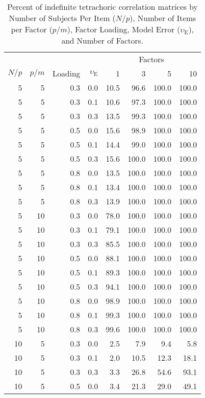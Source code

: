 \documentclass[
  english,
  man]{apa6}
\begin{document}
\begin{appendix}
\begin{longtable}[t]{rrrrrrrr}
\caption{\label{tab:percent-indefinite}Percent of indefinite tetrachoric correlation
matrices by Number of Subjects Per Item (\(N/p\)), Number of Items per
Factor (\(p/m\)), Factor Loading, Model Error (\(\upsilon_\textrm{E}\)),
and Number of Factors.}\\
\toprule
\multicolumn{4}{c}{ } & \multicolumn{4}{c}{Factors} \\
\cmidrule(l{3pt}r{3pt}){5-8}
$N/p$ & $p/m$ & Loading & $\upsilon_{\textrm{E}}$ & 1 & 3 & 5 & 10\\
\midrule
5 & 5 & 0.3 & 0.0 & 10.5 & 96.6 & 100.0 & 100.0\\
5 & 5 & 0.3 & 0.1 & 10.6 & 97.3 & 100.0 & 100.0\\
5 & 5 & 0.3 & 0.3 & 13.5 & 99.3 & 100.0 & 100.0\\
5 & 5 & 0.5 & 0.0 & 15.6 & 98.9 & 100.0 & 100.0\\
5 & 5 & 0.5 & 0.1 & 14.4 & 99.0 & 100.0 & 100.0\\
5 & 5 & 0.5 & 0.3 & 15.6 & 100.0 & 100.0 & 100.0\\
5 & 5 & 0.8 & 0.0 & 13.5 & 100.0 & 100.0 & 100.0\\
5 & 5 & 0.8 & 0.1 & 13.4 & 100.0 & 100.0 & 100.0\\
5 & 5 & 0.8 & 0.3 & 13.9 & 100.0 & 100.0 & 100.0\\
5 & 10 & 0.3 & 0.0 & 78.0 & 100.0 & 100.0 & 100.0\\
5 & 10 & 0.3 & 0.1 & 79.1 & 100.0 & 100.0 & 100.0\\
5 & 10 & 0.3 & 0.3 & 85.5 & 100.0 & 100.0 & 100.0\\
5 & 10 & 0.5 & 0.0 & 88.1 & 100.0 & 100.0 & 100.0\\
5 & 10 & 0.5 & 0.1 & 89.3 & 100.0 & 100.0 & 100.0\\
5 & 10 & 0.5 & 0.3 & 94.1 & 100.0 & 100.0 & 100.0\\
5 & 10 & 0.8 & 0.0 & 98.9 & 100.0 & 100.0 & 100.0\\
5 & 10 & 0.8 & 0.1 & 99.3 & 100.0 & 100.0 & 100.0\\
5 & 10 & 0.8 & 0.3 & 99.6 & 100.0 & 100.0 & 100.0\\
10 & 5 & 0.3 & 0.0 & 2.5 & 7.9 & 9.4 & 5.8\\
10 & 5 & 0.3 & 0.1 & 2.0 & 10.5 & 12.3 & 18.1\\
10 & 5 & 0.3 & 0.3 & 3.3 & 26.8 & 54.6 & 93.1\\
10 & 5 & 0.5 & 0.0 & 3.4 & 21.3 & 29.0 & 49.1\\

\end{longtable}
\end{appendix}
\end{document}
